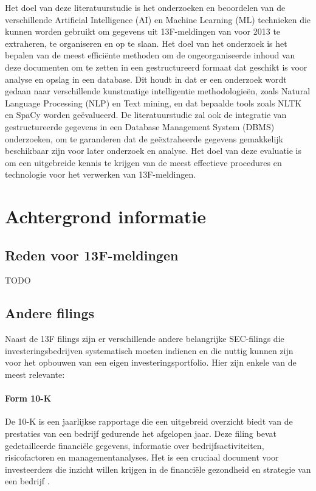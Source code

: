 Het doel van deze literatuurstudie is het onderzoeken en beoordelen van de verschillende Artificial Intelligence (AI) en Machine Learning (ML) technieken die kunnen worden gebruikt om gegevens uit 13F-meldingen van voor 2013 te extraheren, te organiseren en op te slaan. Het doel van het onderzoek is het bepalen van de meest efficiënte methoden om de ongeorganiseerde inhoud van deze documenten om te zetten in een gestructureerd formaat dat geschikt is voor analyse en opslag in een database. Dit houdt in dat er een onderzoek wordt gedaan naar verschillende kunstmatige intelligentie methodologieën, zoals Natural Language Processing (NLP) en Text mining, en dat bepaalde tools zoals NLTK en SpaCy worden geëvalueerd. De literatuurstudie zal ook de integratie van gestructureerde gegevens in een Database Management System (DBMS) onderzoeken, om te garanderen dat de geëxtraheerde gegevens gemakkelijk beschikbaar zijn voor later onderzoek en analyse. Het doel van deze evaluatie is om een uitgebreide kennis te krijgen van de meest effectieve procedures en technologie voor het verwerken van 13F-meldingen. 
\section{Achtergrond informatie}
\subsection{Reden voor 13F-meldingen}
TODO
\subsection{Andere filings}
Naast de 13F filings zijn er verschillende andere belangrijke SEC-filings die investeringsbedrijven systematisch moeten indienen en die nuttig kunnen zijn voor het opbouwen van een eigen investeringsportfolio. Hier zijn enkele van de meest relevante:

\paragraph{Form 10-K}
De 10-K is een jaarlijkse rapportage die een uitgebreid overzicht biedt van de prestaties van een bedrijf gedurende het afgelopen jaar. Deze filing bevat gedetailleerde financiële gegevens, informatie over bedrijfsactiviteiten, risicofactoren en managementanalyses. Het is een cruciaal document voor investeerders die inzicht willen krijgen in de financiële gezondheid en strategie van een bedrijf \autocite{SECfiling2024} .

